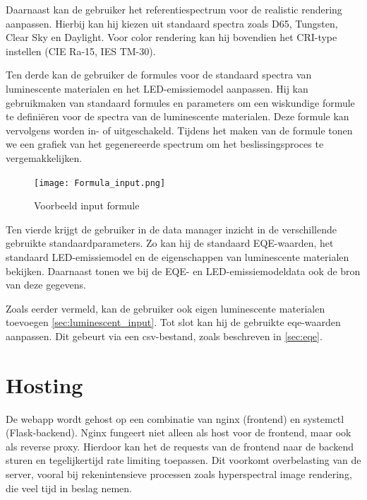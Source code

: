 Daarnaast kan de gebruiker het referentiespectrum voor de realistic rendering aanpassen. Hierbij kan hij kiezen uit standaard spectra zoals D65, Tungsten, Clear Sky en Daylight. Voor color rendering kan hij bovendien het CRI-type instellen (CIE Ra-15, IES TM-30).

Ten derde kan de gebruiker de formules voor de standaard spectra van luminescente materialen en het LED-emissiemodel aanpassen. Hij kan gebruikmaken van standaard formules en parameters om een wiskundige formule te defini\"eren voor de spectra van de luminescente materialen. Deze formule kan vervolgens worden in- of uitgeschakeld. Tijdens het maken van de formule tonen we een grafiek van het gegenereerde spectrum om het beslissingsproces te vergemakkelijken.

\begin{figure}[H]
    \centering
    \texttt{[image: Formula\_input.png]}
    \caption{Voorbeeld input formule}%
    \label{fig:formula_input}
\end{figure}

Ten vierde krijgt de gebruiker in de data manager inzicht in de verschillende gebruikte standaardparameters. Zo kan hij de standaard EQE-waarden, het standaard LED-emissiemodel en de eigenschappen van luminescente materialen bekijken. Daarnaast tonen we bij de EQE- en LED-emissiemodeldata ook de bron van deze gegevens.

Zoals eerder vermeld, kan de gebruiker ook eigen luminescente materialen toevoegen \ref{sec:luminescent_input}. Tot slot kan hij de gebruikte \gls{eqe}-waarden aanpassen. Dit gebeurt via een \gls{csv}-bestand, zoals beschreven in \ref{sec:eqe}.

\section{Hosting}

De webapp wordt gehost op een combinatie van nginx (frontend) en systemctl (Flask-backend). Nginx fungeert niet alleen als host voor de frontend, maar ook als reverse proxy. Hierdoor kan het de requests van de frontend naar de backend sturen en tegelijkertijd rate limiting toepassen. Dit voorkomt overbelasting van de server, vooral bij rekenintensieve processen zoals hyperspectral image rendering, die veel tijd in beslag nemen.